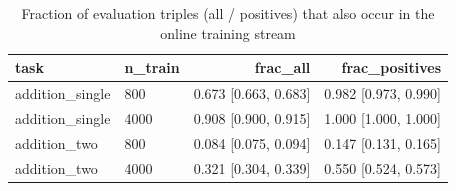 \begin{table}[t]
\centering
\small
\begin{tabular}{llrr}
\toprule
task & n\_train & frac\_all & frac\_positives \\
\midrule
addition\_single & 800 & 0.673 [0.663, 0.683] & 0.982 [0.973, 0.990] \\
addition\_single & 4000 & 0.908 [0.900, 0.915] & 1.000 [1.000, 1.000] \\
addition\_two & 800 & 0.084 [0.075, 0.094] & 0.147 [0.131, 0.165] \\
addition\_two & 4000 & 0.321 [0.304, 0.339] & 0.550 [0.524, 0.573] \\
\bottomrule
\end{tabular}
\caption{Fraction of evaluation triples (all / positives) that also occur in the online training stream}
\label{tab:eval_overlap_addition}
\end{table}